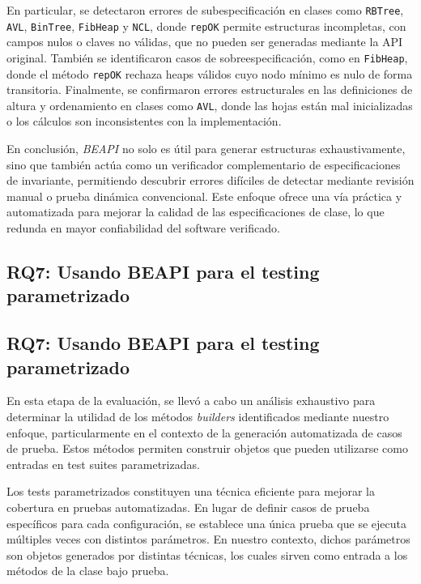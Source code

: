 En particular, se detectaron errores de subespecificación en clases como \texttt{RBTree}, \texttt{AVL}, 
\texttt{BinTree}, \texttt{FibHeap} y \texttt{NCL}, donde \texttt{repOK} permite estructuras 
incompletas, con campos nulos o claves no válidas, que no pueden ser generadas mediante la API 
original. También se identificaron casos de sobreespecificación, como en \texttt{FibHeap}, donde 
el método \texttt{repOK} rechaza heaps válidos cuyo nodo mínimo es nulo de forma transitoria. 
Finalmente, se confirmaron errores estructurales en las definiciones de altura y ordenamiento en 
clases como \texttt{AVL}, donde las hojas están mal inicializadas o los cálculos son inconsistentes 
con la implementación.

En conclusión, \emph{BEAPI} no solo es útil para generar estructuras exhaustivamente, sino que 
también actúa como un verificador complementario de especificaciones de invariante, permitiendo 
descubrir errores difíciles de detectar mediante revisión manual o prueba dinámica convencional. 
Este enfoque ofrece una vía práctica y automatizada para mejorar la calidad de las especificaciones 
de clase, lo que redunda en mayor confiabilidad del software verificado.



\subsection{RQ7: Usando BEAPI para el testing parametrizado}
\subsection{RQ7: Usando BEAPI para el testing parametrizado}

En esta etapa de la evaluación, se llevó a cabo un análisis exhaustivo para determinar la 
utilidad de los métodos \emph{builders} identificados mediante nuestro enfoque, particularmente 
en el contexto de la generación automatizada de casos de prueba. Estos métodos permiten construir 
objetos que pueden utilizarse como entradas en test suites parametrizadas.

Los tests parametrizados constituyen una técnica eficiente para mejorar la cobertura en pruebas 
automatizadas. En lugar de definir casos de prueba específicos para cada configuración, se 
establece una única prueba que se ejecuta múltiples veces con distintos parámetros. En nuestro 
contexto, dichos parámetros son objetos generados por distintas técnicas, los cuales sirven como 
entrada a los métodos de la clase bajo prueba.

